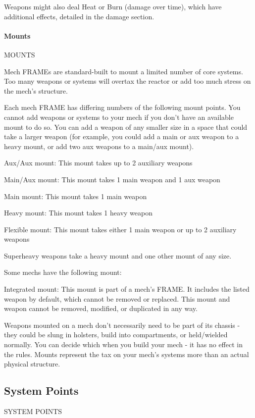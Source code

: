 Weapons might also deal Heat or Burn (damage over time), which have additional effects,
detailed in the damage section.
\paragraph{Mounts}
                                                 MOUNTS

Mech FRAMEs are standard-built to mount a limited number of core systems. Too many
weapons or systems will overtax the reactor or add too much stress on the mech’s structure.


Each mech FRAME has differing numbers of the following mount points. You cannot add
weapons or systems to your mech if you don’t have an available mount to do so. You can add a
weapon of any smaller size in a space that could take a larger weapon (for example, you could
add a main or aux weapon to a heavy mount, or add two aux weapons to a main/aux mount).


Aux/Aux mount: This mount takes up to 2 auxiliary weapons

Main/Aux mount: This mount takes 1 main weapon and 1 aux weapon

Main mount: This mount takes 1 main weapon

Heavy mount:  This mount takes 1 heavy weapon





Flexible mount: This mount takes either 1 main weapon or up to 2 auxiliary weapons


Superheavy weapons take a heavy mount and one other mount of any size.


Some mechs have the following mount:


Integrated mount: This mount is part of a mech’s FRAME. It includes the listed weapon by
default, which cannot be removed or replaced. This mount and weapon cannot be removed,
modified, or duplicated in any way.


Weapons mounted on a mech don’t necessarily need to be part of its chassis - they could be
slung in holsters, build into compartments, or held/wielded normally. You can decide which when
you build your mech - it has no effect in the rules. Mounts represent the tax on your mech’s
systems more than an actual physical structure.


\subsection{System Points}
                                          SYSTEM POINTS


